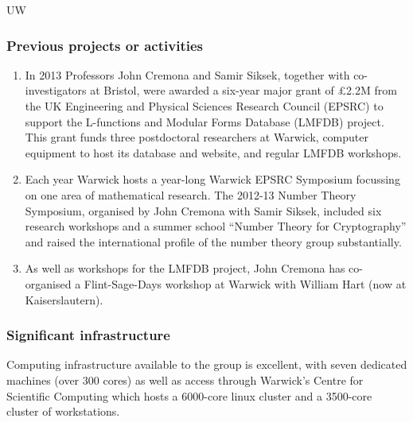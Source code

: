 \begin{sitedescription}{UW}
\subsubsection*{Previous projects or activities}

\begin{enumerate}
\item
In 2013 Professors John Cremona and Samir Siksek, together with
co-investigators at Bristol, were awarded a six-year major grant of
£2.2M from the UK Engineering and Physical Sciences Research Council
(EPSRC) to support the L-functions and Modular Forms Database (LMFDB)
project.  This grant funds three postdoctoral researchers at Warwick,
computer equipment to host its database and website, and regular LMFDB
workshops.
\item
Each year Warwick hosts a year-long Warwick EPSRC Symposium focussing
on one area of mathematical research.  The 2012-13 Number Theory
Symposium, organised by John Cremona with Samir Siksek, included six
research workshops and a summer school ``Number Theory for
Cryptography'' and raised the international profile of the number
theory group substantially.
\item
As well as workshops for the LMFDB project, John Cremona has
co-organised a Flint-Sage-Days workshop at Warwick with William Hart
(now at Kaiserslautern).
\end{enumerate}

\subsubsection*{Significant infrastructure}

Computing infrastructure available to the group is excellent, with
seven dedicated machines (over 300 cores) as well as access through
Warwick's Centre for Scientific Computing which hosts a 6000-core
linux cluster and a 3500-core cluster of workstations.
\end{sitedescription}









